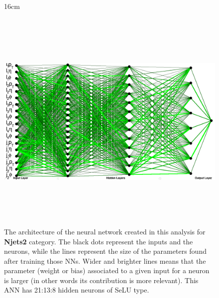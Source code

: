 \label{app:nns_architecture}

\begin{figure}[H!]{16cm}
	\vspace{-20cm}
	\caption{The architecture of the neural network created in this analysis for \textbf{Njets2} category. The black dots represent the inputs and the neurons, while the lines represent the size of the parameters found after training those NNs. Wider and brighter lines means that the parameter (weight or bias) associated to a given input for a neuron is larger (in other words its contribution is more relevant). This ANN has 21:13:8 hidden neurons of SeLU type.}
	\includegraphics[width=18cm,height=11cm,angle=90]{ChapterAnalysis/figs/k57nj2_architecture_horizontal}
\end{figure}
	
